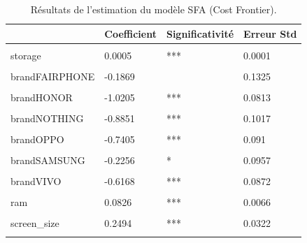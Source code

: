 \documentclass[
  12pt,
]{report}
\begin{document}
\begin{table}[!h]

\caption{\label{tab:scf_results}Résultats de l'estimation du modèle SFA (Cost Frontier).}
\centering
\begin{tabular}[t]{llll}
\toprule
\textbf{ } & \textbf{Coefficient} & \textbf{Significativité} & \textbf{Erreur Std}\\
\midrule
\cellcolor{gray!6}{(Intercept)} & \cellcolor{gray!6}{4.0863} & \cellcolor{gray!6}{***} & \cellcolor{gray!6}{0.2543}\\
storage & 0.0005 & *** & 0.0001\\
\cellcolor{gray!6}{brandASUS} & \cellcolor{gray!6}{-0.3849} & \cellcolor{gray!6}{***} & \cellcolor{gray!6}{0.1092}\\
brandFAIRPHONE & -0.1869 &  & 0.1325\\
\cellcolor{gray!6}{brandGOOGLE} & \cellcolor{gray!6}{-0.5019} & \cellcolor{gray!6}{***} & \cellcolor{gray!6}{0.099}\\
\addlinespace
brandHONOR & -1.0205 & *** & 0.0813\\
\cellcolor{gray!6}{brandMOTOROLA} & \cellcolor{gray!6}{-0.7885} & \cellcolor{gray!6}{***} & \cellcolor{gray!6}{0.0863}\\
brandNOTHING & -0.8851 & *** & 0.1017\\
\cellcolor{gray!6}{brandONEPLUS} & \cellcolor{gray!6}{-0.6815} & \cellcolor{gray!6}{***} & \cellcolor{gray!6}{0.1044}\\
brandOPPO & -0.7405 & *** & 0.091\\
\addlinespace
\cellcolor{gray!6}{brandREALME} & \cellcolor{gray!6}{-0.6727} & \cellcolor{gray!6}{***} & \cellcolor{gray!6}{0.0798}\\
brandSAMSUNG & -0.2256 & * & 0.0957\\
\cellcolor{gray!6}{brandSONY} & \cellcolor{gray!6}{-0.3962} & \cellcolor{gray!6}{***} & \cellcolor{gray!6}{0.1146}\\
brandVIVO & -0.6168 & *** & 0.0872\\
\cellcolor{gray!6}{brandXIAOMI} & \cellcolor{gray!6}{-0.7829} & \cellcolor{gray!6}{***} & \cellcolor{gray!6}{0.0578}\\
\addlinespace
ram & 0.0826 & *** & 0.0066\\
\cellcolor{gray!6}{inductionTRUE} & \cellcolor{gray!6}{0.2857} & \cellcolor{gray!6}{***} & \cellcolor{gray!6}{0.0375}\\
screen\_size & 0.2494 & *** & 0.0322\\
\cellcolor{gray!6}{made\_inInde} & \cellcolor{gray!6}{-0.151} & \cellcolor{gray!6}{} & \cellcolor{gray!6}{0.2258}\\

\end{tabular}
\end{table}
\end{document}
